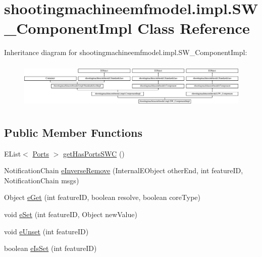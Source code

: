 \hypertarget{classshootingmachineemfmodel_1_1impl_1_1_s_w___component_impl}{\section{shootingmachineemfmodel.\-impl.\-S\-W\-\_\-\-Component\-Impl Class Reference}
\label{classshootingmachineemfmodel_1_1impl_1_1_s_w___component_impl}
}
Inheritance diagram for shootingmachineemfmodel.\-impl.\-S\-W\-\_\-\-Component\-Impl\-:\begin{figure}[H]
\begin{center}
\leavevmode
\includegraphics[height=2.272727cm]{classshootingmachineemfmodel_1_1impl_1_1_s_w___component_impl}
\end{center}
\end{figure}
\subsection*{Public Member Functions}
\begin{DoxyCompactItemize}
\item 
E\-List$<$ \hyperlink{interfaceshootingmachineemfmodel_1_1_ports}{Ports} $>$ \hyperlink{classshootingmachineemfmodel_1_1impl_1_1_s_w___component_impl_a506d6529374f47b28cb78ec920852c3b}{get\-Has\-Ports\-S\-W\-C} ()
\item 
Notification\-Chain \hyperlink{classshootingmachineemfmodel_1_1impl_1_1_s_w___component_impl_aac675403ec8b7edd732fbcdc318870c8}{e\-Inverse\-Remove} (Internal\-E\-Object other\-End, int feature\-I\-D, Notification\-Chain msgs)
\item 
Object \hyperlink{classshootingmachineemfmodel_1_1impl_1_1_s_w___component_impl_ab9a7768db026efa139cea5f5db7204eb}{e\-Get} (int feature\-I\-D, boolean resolve, boolean core\-Type)
\item 
void \hyperlink{classshootingmachineemfmodel_1_1impl_1_1_s_w___component_impl_a38a49de38ae9e7d97ff605849e9fab8a}{e\-Set} (int feature\-I\-D, Object new\-Value)
\item 
void \hyperlink{classshootingmachineemfmodel_1_1impl_1_1_s_w___component_impl_a293670ea83f8b059dedf62e07c4df992}{e\-Unset} (int feature\-I\-D)
\item 
boolean \hyperlink{classshootingmachineemfmodel_1_1impl_1_1_s_w___component_impl_ac04ae39c3f817cd1b61d4b855e52c0c3}{e\-Is\-Set} (int feature\-I\-D)
\end{DoxyCompactItemize}
